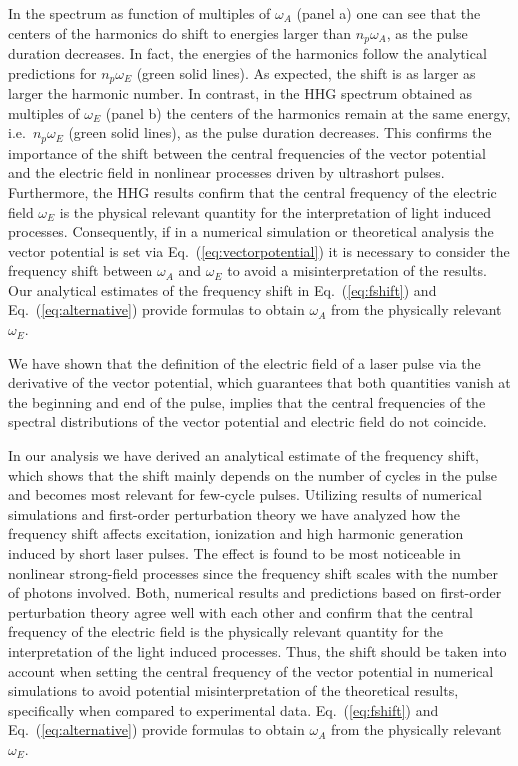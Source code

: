 In the spectrum as function of multiples of $\omega_A$ (panel a) one can see that the centers of the harmonics do shift to energies larger than $n_p\omega_A$, as the pulse duration decreases. In fact, the energies of the harmonics follow the analytical predictions for $n_p\omega_E$ (green solid lines). As expected, the shift is as larger as larger the harmonic number. In contrast, in the HHG spectrum obtained as multiples of $\omega_E$ (panel b) the centers of the harmonics remain at the same energy, i.e.~$n_p\omega_E$ (green solid lines), as the pulse duration decreases. This confirms the importance of the shift between the central frequencies of the vector potential and the electric field in nonlinear processes driven by ultrashort pulses. Furthermore, the HHG results confirm that the central frequency of the electric field $\omega_E$ is the physical relevant quantity for the interpretation of light induced processes. Consequently, if in a numerical simulation or theoretical analysis the vector potential is set via Eq.~(\ref{eq:vectorpotential}) it is necessary to consider the frequency shift between $\omega_A$ and $\omega_E$ to avoid a misinterpretation of the results. Our analytical estimates of the frequency shift in Eq.~(\ref{eq:fshift}) and Eq.~(\ref{eq:alternative}) provide formulas to obtain $\omega_A$ from the physically relevant $\omega_E$.


We have shown that the definition of the electric field of a laser pulse via the derivative of the vector potential, which guarantees that both quantities vanish at the beginning and end of the pulse, implies that the central frequencies of the spectral distributions of the vector potential and electric field do not coincide. 

In our analysis we have derived an analytical estimate of the frequency shift, which shows that the shift mainly depends on the number of cycles in the pulse and becomes most relevant for few-cycle pulses. Utilizing results of numerical simulations and first-order perturbation theory we have analyzed how the frequency shift affects excitation, ionization and high harmonic generation induced by short laser pulses. The effect is found to be most noticeable in nonlinear strong-field processes since the frequency shift scales with the number of photons involved. Both, numerical results and predictions based on first-order perturbation theory agree well with each other and confirm that the central frequency of the electric field is the physically relevant quantity for the interpretation of the light induced processes. Thus, the shift should be taken into account when setting the central frequency of the vector potential in numerical simulations to avoid potential misinterpretation of the theoretical results, specifically when compared to experimental data. Eq.~(\ref{eq:fshift}) and Eq.~(\ref{eq:alternative}) provide formulas to obtain $\omega_A$ from the physically relevant $\omega_E$.


